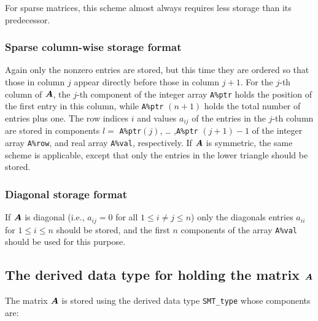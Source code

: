 \documentclass{galahad}
\begin{document}
For sparse matrices, this scheme almost always requires less storage than 
its predecessor.

\subsubsection{Sparse column-wise storage format}\label{columnwise}
Again only the nonzero entries are stored, but this time they are
ordered so that those in column $j$ appear directly before those in column
$j+1$. For the $j$-th column of ${\bm{A}}$, the $j$-th component of the integer
array {\tt A\%ptr} holds the position of the first entry in this column,
while {\tt A\%ptr} $(n+1)$ holds the total number of entries plus one.
The row indices $i$ and values $a_{ij}$ of the entries in the
$j$-th column are stored in components $l =$ {\tt A\%ptr}$(j)$, \ldots
,{\tt A\%ptr} $(j+1)-1$ of the integer array {\tt A\%row}, and real
array {\tt A\%val}, respectively.  If ${\bm{A}}$ is symmetric, the same
scheme is applicable, except that only the entries in the lower
triangle should be stored.

\subsubsection{Diagonal storage format}\label{diagonal}
If ${\bm{A}}$ is diagonal (i.e., $a_{ij} = 0$ for all $1 \leq i \neq j
\leq n$) only the diagonals entries $a_{ii}$ for $1 \leq i \leq n$ should
be stored, and the first $n$ components of the array {\tt A\%val}
should be used for this purpose.





\subsection{The derived data type for holding the matrix ${\bm{A}}$}\label{typesmt}
The matrix ${\bm{A}}$ is stored using the derived data type {\tt SMT\_type}
whose components are:
\end{document}
